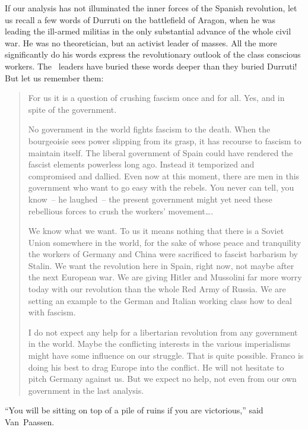 If our analysis has not illuminated the inner forces of the Spanish revolution, let us recall a few words of Durruti on the battlefield of Aragon, when he was leading the ill-armed militias in the only substantial advance of the whole civil war. He was no theoretician, but an activist leader of masses. All the more significantly do his words express the revolutionary outlook of the class conscious workers. The \CNT\ leaders have buried these words deeper than they buried Durruti! But let us remember them:

\vfill

\begin{quotation}
  For us it is a question of crushing fascism once and for all. Yes, and in spite of the government.
  
  No government in the world fights fascism to the death. When the bourgeoisie sees power slipping from its grasp, it has recourse to fascism to maintain itself. The liberal government of Spain could have rendered the fascist elements powerless long ago. Instead it temporized and compromised and dallied. Even now at this moment, there are men in this government who want to go easy with the rebels. You never can tell, you know~-- he laughed~-- the present government might yet need these rebellious forces to crush the workers’ movement\dots.
  
  We know what we want. To us it means nothing that there is a Soviet Union somewhere in the world, for the sake of whose peace and tranquility the workers of Germany and China were sacrificed to fascist barbarism by Stalin. We want the revolution here in Spain, right now\kn, not maybe after the next European war. We are giving Hitler and Mussolini far more worry today with our revolution than the whole Red Army of Russia. We are setting an example to the German and Italian working class how to deal with fascism.
  
  I do not expect any help for a libertarian revolution from any government in the world. Maybe the conflicting interests in the various imperialisms might have some influence on our struggle. That is quite possible. Franco is doing his best to drag Europe into the conflict. He will not hesitate to pitch Germany against us. But we expect no help, not even from our own government in the last analysis.
\end{quotation}

\vfill

\newpage

``You will be sitting on top of a pile of ruins if you are victorious,\kn\kn'' said Van~Paassen.

